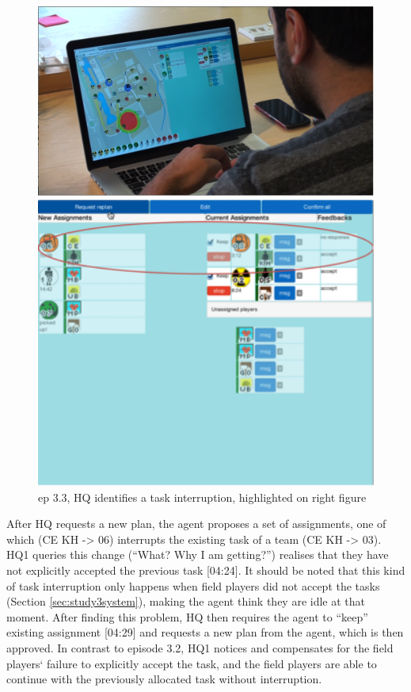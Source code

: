 \begin{figure}[ht]
\centering
\begin{minipage}[b]{0.45\linewidth}
\includegraphics[width=1\textwidth]{img/study3/ep31}


\end{minipage}
\quad
\begin{minipage}[b]{0.45\linewidth}
 \includegraphics[width=1\textwidth]{img/study3/ep32}
\end{minipage}
\label{fig:study3ep31}
\caption{ep 3.3, HQ identifies a task interruption, highlighted on right figure}
\end{figure}

After HQ requests a new plan, the agent proposes a set of assignments, one of which (CE KH -> 06) interrupts the existing task of a team (CE KH -> 03). HQ1 queries this change (``What? Why I am getting?'') realises that they have not explicitly accepted the previous task [04:24]. It should be noted that this kind of task interruption only happens when field players did not accept the tasks (Section \ref{sec:study3system}), making the agent think they are idle at that moment. After finding this problem, HQ then requires the agent to ``keep'' existing assignment [04:29] and requests a new plan from the agent, which is then approved. In contrast to episode 3.2, HQ1 notices and compensates for the field players` failure to explicitly accept the task, and the field players are able to continue with the previously allocated task without interruption.\\
